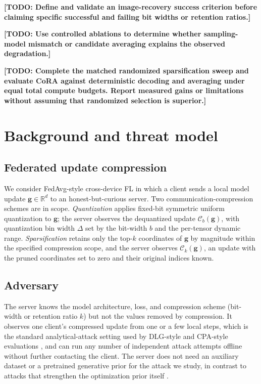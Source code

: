 \documentclass{article}
\newcommand{\g}{\mathbf{g}}
\newcommand{\C}{\mathcal{C}}
\newcommand{\R}{\mathbb{R}}
\newcommand{\todo}[1]{\textbf{[TODO: #1]}}
\begin{document}
\todo{Define and validate an image-recovery success criterion before
claiming specific successful and failing bit widths or retention ratios.}

\todo{Use controlled ablations to determine whether sampling-model
mismatch or candidate averaging explains the observed degradation.}

\todo{Complete the matched randomized sparsification sweep and evaluate
CoRA against deterministic decoding and averaging under equal total
compute budgets. Report measured gains or limitations without assuming
that randomized selection is superior.}

\section{Background and threat model}
\subsection{Federated update compression}
We consider FedAvg-style cross-device FL in which a client sends a local
model update $\g\in\R^{d}$ to an honest-but-curious server. Two
communication-compression schemes are in scope. \emph{Quantization} applies
fixed-bit symmetric uniform quantization to $\g$; the server observes the
dequantized update $\C_b(\g)$, with quantization bin width $\Delta$ set by
the bit-width $b$ and the per-tensor dynamic range. \emph{Sparsification} retains only the top-$k$ coordinates of $\g$
by magnitude within the specified compression scope, and the server
observes $\C_k(\g)$, an update with the pruned coordinates set to zero
and their original indices known.


\subsection{Adversary}
The server knows the model architecture, loss, and compression scheme
(bit-width or retention ratio $k$) but not the values removed by compression.
It observes one client's compressed update from one or a few local steps,
which is the standard analytical-attack setting used by DLG-style and CPA-style
evaluations \cite{zhu2019deep,kariyappa2023cocktail}, and can run any number
of independent attack attempts offline without further contacting the client.
The server does not need an auxiliary dataset or a pretrained generative
prior for the attack we study, in contrast to attacks that strengthen the
optimization prior itself \cite{li2022ggl}.
\end{document}
